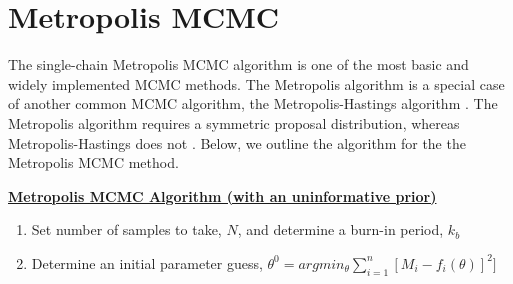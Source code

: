 \documentclass{article}
\begin{document}
\section{Metropolis MCMC} \label{Metropolis_MCMC}
The single-chain Metropolis MCMC algorithm is one of the most basic and widely implemented MCMC methods. The Metropolis algorithm is a special case of another common MCMC algorithm, the Metropolis-Hastings algorithm \cite{metropolis1953}. The Metropolis algorithm requires a symmetric proposal distribution, whereas Metropolis-Hastings does not \cite{smithCh8}. Below, we outline the algorithm for the the Metropolis MCMC method.\\
\begin{tcolorbox} \label{alg:met}
\textbf{\underline{Metropolis MCMC Algorithm (with an uninformative prior)}} 
\begin{enumerate}
    \item Set number of samples to take, $N$, and determine a burn-in period, $k_b$
    \item \label{step:2met} Determine an initial parameter guess, $\theta^0 = argmin_\theta \sum_{i=1}^{n}[M_i - f_i(\theta)]^2]$


\end{enumerate}
\end{tcolorbox}
\end{document}
